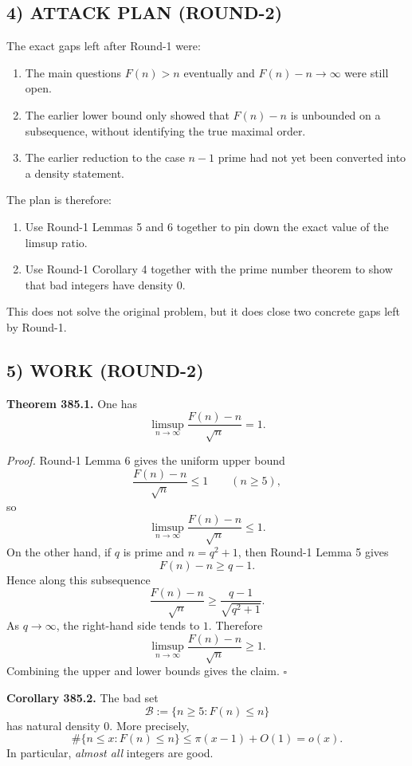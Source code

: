 \subsection*{4) ATTACK PLAN (ROUND-2)}
The exact gaps left after Round-1 were:

\begin{enumerate}
\item The main questions $F(n)>n$ eventually and $F(n)-n\to\infty$ were still open.
\item The earlier lower bound only showed that $F(n)-n$ is unbounded on a subsequence, without identifying the true maximal order.
\item The earlier reduction to the case $n-1$ prime had not yet been converted into a density statement.
\end{enumerate}

The plan is therefore:

\begin{enumerate}
\item Use Round-1 Lemmas 5 and 6 together to pin down the exact value of the limsup ratio.
\item Use Round-1 Corollary 4 together with the prime number theorem to show that bad integers have density $0$.
\end{enumerate}

This does not solve the original problem, but it does close two concrete gaps left by Round-1.

\subsection*{5) WORK (ROUND-2)}

\textbf{Theorem 385.1.} One has
\[
\limsup_{n\to\infty}\frac{F(n)-n}{\sqrt n}=1.
\]

\emph{Proof.} Round-1 Lemma 6 gives the uniform upper bound
\[
\frac{F(n)-n}{\sqrt n}\leq 1
\qquad (n\geq 5),
\]
so
\[
\limsup_{n\to\infty}\frac{F(n)-n}{\sqrt n}\leq 1.
\]
On the other hand, if $q$ is prime and $n=q^2+1$, then Round-1 Lemma 5 gives
\[
F(n)-n\geq q-1.
\]
Hence along this subsequence
\[
\frac{F(n)-n}{\sqrt n}
\geq
\frac{q-1}{\sqrt{q^2+1}}.
\]
As $q\to\infty$, the right-hand side tends to $1$. Therefore
\[
\limsup_{n\to\infty}\frac{F(n)-n}{\sqrt n}\geq 1.
\]
Combining the upper and lower bounds gives the claim. \hfill $\square$

\medskip

\textbf{Corollary 385.2.} The bad set
\[
\mathcal B:=\{n\geq 5: F(n)\leq n\}
\]
has natural density $0$. More precisely,
\[
\#\{n\leq x: F(n)\leq n\}\leq \pi(x-1)+O(1)=o(x).
\]
In particular, \emph{almost all} integers are good.


